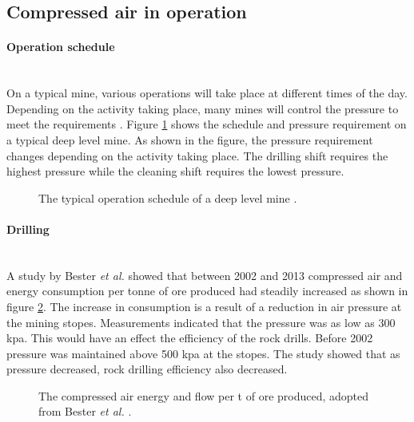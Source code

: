 \subsection{Compressed air in operation}
	\paragraph{Operation schedule}\leavevmode\\
	On a typical mine, various operations will take place at different times of the day. Depending on the activity taking place, many mines will control the pressure to meet the requirements \cite{Kriel2014Masters,Marais2012PhD}. Figure \ref{fig: Mining schedule} shows the schedule and pressure requirement on a typical deep level mine. As shown in the figure, the pressure requirement changes depending on the activity taking place. The drilling shift requires the highest pressure while the cleaning shift requires the lowest pressure.
		\begin{figure}[h]
		\centering
		\fbox{}
		\caption[A typical operation schedule of a deep level mine.]{The typical operation schedule of a deep level mine \cite{Kriel2014Masters}.}
		\label{fig: Mining schedule}
	\end{figure}
	\paragraph*{Drilling}\leavevmode\\
	A study by  Bester \textit{et al.} showed that between 2002 and 2013 compressed air and energy consumption per tonne of ore produced had steadily increased as shown in figure \ref{fig: Compressed energy and air flow per ton}. The increase in consumption is a result of a reduction in air pressure at the mining stopes. Measurements indicated that the pressure was as low as 300 \gls{kpa}. This would have an effect the efficiency of the rock drills. Before 2002 pressure was maintained above 500 \gls{kpa} at the stopes.  The study showed that as pressure decreased, rock drilling efficiency also decreased.\cite{bester2013effect} \par
	
	\begin{figure}[h]
		\centering
		\fbox{}
		\caption[The compressed air energy and flow per tonne of ore produced.]{The compressed air energy and flow per \gls{t} of ore produced, adopted from Bester \textit{et al.} \cite{bester2013effect}.}
		\label{fig: Compressed energy and air flow per ton}
	\end{figure}

